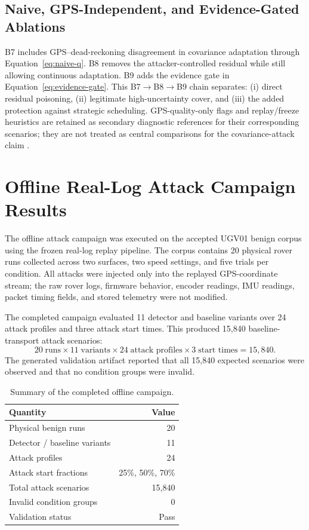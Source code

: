 \documentclass[11pt,a4paper]{article}
\begin{document}
\subsection{Naive, GPS-Independent, and Evidence-Gated Ablations}
B7 includes GPS--dead-reckoning disagreement in covariance adaptation through Equation~\eqref{eq:naive-q}. B8 removes the attacker-controlled residual while still allowing continuous adaptation. B9 adds the evidence gate in Equation~\eqref{eq:evidence-gate}. This B7$\rightarrow$B8$\rightarrow$B9 chain separates: (i) direct residual poisoning, (ii) legitimate high-uncertainty cover, and (iii) the added protection against strategic scheduling. GPS-quality-only flags and replay/freeze heuristics are retained as secondary diagnostic references for their corresponding scenarios; they are not treated as central comparisons for the covariance-attack claim \cite{shen2020drift,sathaye2021semperfi,satchidanandan2017dynamic,yaghooti2021physical}.
\section{Offline Real-Log Attack Campaign Results}
\label{sec:offline_results}

The offline attack campaign was executed on the accepted UGV01 benign corpus using the frozen real-log replay pipeline. The corpus contains 20 physical rover runs collected across two surfaces, two speed settings, and five trials per condition. All attacks were injected only into the replayed GPS-coordinate stream; the raw rover logs, firmware behavior, encoder readings, IMU readings, packet timing fields, and stored telemetry were not modified.

The completed campaign evaluated 11 detector and baseline variants over 24 attack profiles and three attack start times. This produced 15,840 baseline-transport attack scenarios:
\[
20 \; \text{runs}
\times 11 \; \text{variants}
\times 24 \; \text{attack profiles}
\times 3 \; \text{start times}
= 15{,}840.
\]
The generated validation artifact reported that all 15,840 expected scenarios were observed and that no condition groups were invalid.

\begin{table}[t]
\centering
\caption{Summary of the completed offline campaign.}
\label{tab:offline_campaign_summary}
\begin{tabular}{lr}
\hline
Quantity & Value \\
\hline
Physical benign runs & 20 \\
Detector / baseline variants & 11 \\
Attack profiles & 24 \\
Attack start fractions & 25\%, 50\%, 70\% \\
Total attack scenarios & 15,840 \\
Invalid condition groups & 0 \\
Validation status & Pass \\
\hline
\end{tabular}
\end{table}
\end{document}
